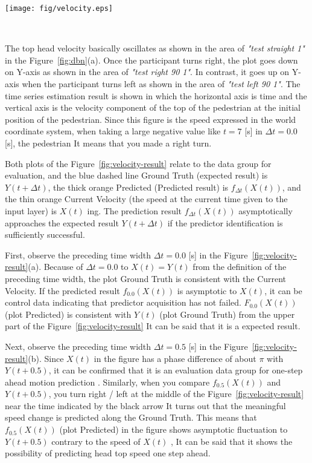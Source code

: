 \documentclass{sigchi}
\begin{document}
\begin{figure*} 
\centering
  \texttt{[image: fig/velocity.eps]}\hspace{-15mm} 
  \caption{$ x $ speed prediction result in the axial direction ($ \Delta t $ represents the preceding time width)}~\label{fig:velocity-result}
\end{figure*}

The top head velocity basically oscillates as shown in the area of \textit{"test straight 1"} in the Figure~\ref{fig:dbn}(a). Once the participant turns right, the plot goes down on Y-axis as shown in the area of \textit{"test right 90 1"}. In contrast, it goes up on Y-axis when the participant turns left as shown in the area of \textit{"test left 90 1"}. The time series estimation result is shown in which the horizontal axis is time and the vertical axis is the velocity component of the top of the pedestrian at the initial position of the pedestrian. Since this figure is the speed expressed in the world coordinate system, when taking a large negative value like $ t = 7 $ [s] in $ \Delta t = 0.0 $ [s], the pedestrian It means that you made a right turn.



Both plots of the Figure~\ref{fig:velocity-result} relate to the data group for evaluation, and the blue dashed line Ground Truth (expected result) is $ Y (t + \Delta t) $, the thick orange Predicted (Predicted result) is $ f_ {\Delta t} (X (t)) $, and the thin orange Current Velocity (the speed at the current time given to the input layer) is $ X (t) $ ing. The prediction result $ f_ {\Delta t} (X (t)) $ asymptotically approaches the expected result $ Y (t + \Delta t) $ if the predictor identification is sufficiently successful.

First, observe the preceding time width $ \Delta t = 0.0 $ [s] in the Figure~\ref{fig:velocity-result}(a). Because of $ \Delta t = 0.0 $ to $ X (t) = Y (t) $ from the definition of the preceding time width, the plot Ground Truth is consistent with the Current Velocity. If the predicted result $ f_ {0.0} (X (t)) $ is asymptotic to $ X (t) $, it can be control data indicating that predictor acquisition has not failed. $ F_ {0.0} (X (t)) $ (plot Predicted) is consistent with $ Y (t) $ (plot Ground Truth) from the upper part of the Figure~\ref{fig:velocity-result} It can be said that it is a expected result.

Next, observe the preceding time width $ \Delta t = 0.5 $ [s] in the Figure~\ref{fig:velocity-result}(b). Since $ X (t) $ in the figure has a phase difference of about $ \pi $ with $ Y (t + 0.5) $, it can be confirmed that it is an evaluation data group for one-step ahead motion prediction . Similarly, when you compare $ f_ {0.5} (X (t)) $ and $ Y (t + 0.5) $, you turn right / left at the middle of the Figure~\ref{fig:velocity-result} near the time indicated by the black arrow It turns out that the meaningful speed change is predicted along the Ground Truth. This means that $ f_ {0.5} (X (t)) $ (plot Predicted) in the figure shows asymptotic fluctuation to $ Y (t + 0.5) $ contrary to the speed of $ X (t) $ , It can be said that it shows the possibility of predicting head top speed one step ahead.
\end{document}
